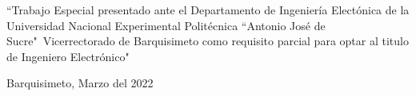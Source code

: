 \begin{table}[t]
\vspace*{3mm}

\parbox[c]{12cm}{
    \begin{center}
        \begin{small}
            ``Trabajo Especial presentado ante el Departamento de Ingeniería
            Electónica de la Universidad Nacional Experimental Politécnica
            ``Antonio José de Sucre"\ Vicerrectorado de Barquisimeto como requisito
            parcial para optar al titulo de Ingeniero Electrónico"

        \end{small}
    \end{center}
}

\vspace*{3mm}

\begin{center}Barquisimeto, Marzo del 2022\end{center}
\end{table}

